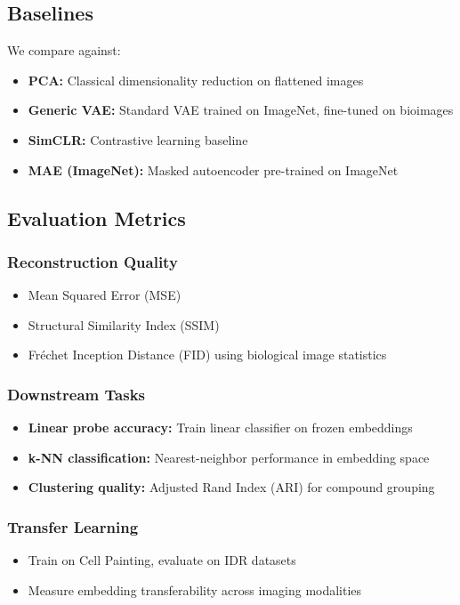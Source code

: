 \subsection{Baselines}

We compare against:
\begin{itemize}
    \item \textbf{PCA:} Classical dimensionality reduction on flattened images
    \item \textbf{Generic VAE:} Standard VAE trained on ImageNet, fine-tuned on bioimages
    \item \textbf{SimCLR:} Contrastive learning baseline
    \item \textbf{MAE (ImageNet):} Masked autoencoder pre-trained on ImageNet
\end{itemize}

\subsection{Evaluation Metrics}

\subsubsection{Reconstruction Quality}
\begin{itemize}
    \item Mean Squared Error (MSE)
    \item Structural Similarity Index (SSIM)
    \item Fréchet Inception Distance (FID) using biological image statistics
\end{itemize}

\subsubsection{Downstream Tasks}
\begin{itemize}
    \item \textbf{Linear probe accuracy:} Train linear classifier on frozen embeddings
    \item \textbf{k-NN classification:} Nearest-neighbor performance in embedding space
    \item \textbf{Clustering quality:} Adjusted Rand Index (ARI) for compound grouping
\end{itemize}

\subsubsection{Transfer Learning}
\begin{itemize}
    \item Train on Cell Painting, evaluate on IDR datasets
    \item Measure embedding transferability across imaging modalities
\end{itemize}


